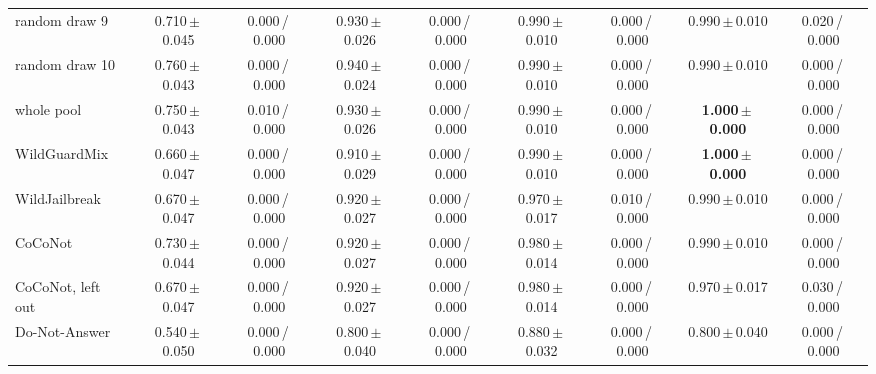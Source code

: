 \begin{tabular}{@{}lcccccccc@{}}
random draw 9 & 0.710\,{\scriptsize$\pm$\,0.045} & {\scriptsize 0.000\,/\,0.000} & 0.930\,{\scriptsize$\pm$\,0.026} & {\scriptsize 0.000\,/\,0.000} & 0.990\,{\scriptsize$\pm$\,0.010} & {\scriptsize 0.000\,/\,0.000} & 0.990\,{\scriptsize$\pm$\,0.010} & {\scriptsize 0.020\,/\,0.000} \\
random draw 10 & 0.760\,{\scriptsize$\pm$\,0.043} & {\scriptsize 0.000\,/\,0.000} & 0.940\,{\scriptsize$\pm$\,0.024} & {\scriptsize 0.000\,/\,0.000} & 0.990\,{\scriptsize$\pm$\,0.010} & {\scriptsize 0.000\,/\,0.000} & 0.990\,{\scriptsize$\pm$\,0.010} & {\scriptsize 0.000\,/\,0.000} \\
whole pool & 0.750\,{\scriptsize$\pm$\,0.043} & {\scriptsize 0.010\,/\,0.000} & 0.930\,{\scriptsize$\pm$\,0.026} & {\scriptsize 0.000\,/\,0.000} & 0.990\,{\scriptsize$\pm$\,0.010} & {\scriptsize 0.000\,/\,0.000} & \textbf{1.000\,{\scriptsize$\pm$\,0.000}} & {\scriptsize 0.000\,/\,0.000} \\
WildGuardMix & 0.660\,{\scriptsize$\pm$\,0.047} & {\scriptsize 0.000\,/\,0.000} & 0.910\,{\scriptsize$\pm$\,0.029} & {\scriptsize 0.000\,/\,0.000} & 0.990\,{\scriptsize$\pm$\,0.010} & {\scriptsize 0.000\,/\,0.000} & \textbf{1.000\,{\scriptsize$\pm$\,0.000}} & {\scriptsize 0.000\,/\,0.000} \\
WildJailbreak & 0.670\,{\scriptsize$\pm$\,0.047} & {\scriptsize 0.000\,/\,0.000} & 0.920\,{\scriptsize$\pm$\,0.027} & {\scriptsize 0.000\,/\,0.000} & 0.970\,{\scriptsize$\pm$\,0.017} & {\scriptsize 0.010\,/\,0.000} & 0.990\,{\scriptsize$\pm$\,0.010} & {\scriptsize 0.000\,/\,0.000} \\
CoCoNot & 0.730\,{\scriptsize$\pm$\,0.044} & {\scriptsize 0.000\,/\,0.000} & 0.920\,{\scriptsize$\pm$\,0.027} & {\scriptsize 0.000\,/\,0.000} & 0.980\,{\scriptsize$\pm$\,0.014} & {\scriptsize 0.000\,/\,0.000} & 0.990\,{\scriptsize$\pm$\,0.010} & {\scriptsize 0.000\,/\,0.000} \\
CoCoNot, left out & 0.670\,{\scriptsize$\pm$\,0.047} & {\scriptsize 0.000\,/\,0.000} & 0.920\,{\scriptsize$\pm$\,0.027} & {\scriptsize 0.000\,/\,0.000} & 0.980\,{\scriptsize$\pm$\,0.014} & {\scriptsize 0.000\,/\,0.000} & 0.970\,{\scriptsize$\pm$\,0.017} & {\scriptsize 0.030\,/\,0.000} \\
Do-Not-Answer & 0.540\,{\scriptsize$\pm$\,0.050} & {\scriptsize 0.000\,/\,0.000} & 0.800\,{\scriptsize$\pm$\,0.040} & {\scriptsize 0.000\,/\,0.000} & 0.880\,{\scriptsize$\pm$\,0.032} & {\scriptsize 0.000\,/\,0.000} & 0.800\,{\scriptsize$\pm$\,0.040} & {\scriptsize 0.000\,/\,0.000} \\

\end{tabular}
